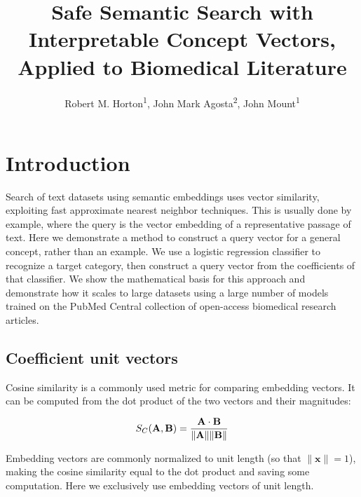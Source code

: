 \documentclass[letterpaper]{article} %
\title{Safe Semantic Search with Interpretable Concept Vectors, Applied to Biomedical Literature}
\author {
    Robert M. Horton\textsuperscript{\rm 1},
    John Mark Agosta\textsuperscript{\rm 2},
    John Mount\textsuperscript{\rm 1}
}
\begin{document}
\maketitle

\begin{abstract}
    
\end{abstract}

%

\section{Introduction}

Search of text datasets using semantic embeddings uses vector similarity, exploiting  fast approximate nearest neighbor techniques. 
This is usually done by example, where the query is the vector embedding of a representative passage of text.
Here we demonstrate a method to construct a query vector for a general concept, rather than an example. We use a logistic regression classifier to recognize a target category, then construct a query vector from the coefficients of that classifier. We show the mathematical basis for this approach and demonstrate how it scales to large datasets using a large number of models trained on the PubMed Central collection of open-access biomedical research articles. %


\subsection{Coefficient unit vectors}

Cosine similarity is a commonly used metric for comparing embedding vectors. It can be computed from the dot product of the two vectors and their magnitudes:

\begin{equation}
S_C (\mathbf{A},\mathbf{B}) = {\mathbf{A} \cdot \mathbf{B} \over \|\mathbf{A}\| \|\mathbf{B}\|}
\end{equation}

Embedding vectors are commonly normalized to unit length (so that $\|\mathbf{x}\| = 1$), making the cosine similarity equal to the dot product and saving some computation. Here we exclusively use embedding vectors of unit length.
\end{document}
